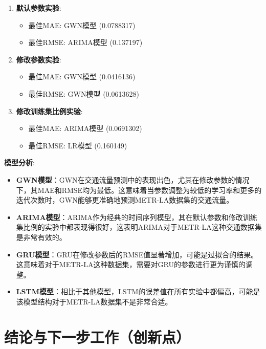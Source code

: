 \documentclass[4pt]{article}
\begin{document}
\begin{enumerate}
  \item \textbf{默认参数实验}:
    \begin{itemize}
      \item 最佳MAE: GWN模型 (0.0788317)
      \item 最佳RMSE: ARIMA模型 (0.137197)
    \end{itemize}

  \item \textbf{修改参数实验}:
    \begin{itemize}
      \item 最佳MAE: GWN模型 (0.0416136)
      \item 最佳RMSE: GWN模型 (0.0613628)
    \end{itemize}

  \item \textbf{修改训练集比例实验}:
    \begin{itemize}
      \item 最佳MAE: ARIMA模型 (0.0691302)
      \item 最佳RMSE: LR模型 (0.160149)
    \end{itemize}
\end{enumerate}

\textbf{模型分析}:
\begin{itemize}
  \item \textbf{GWN模型}：GWN在交通流量预测中的表现出色，尤其在修改参数的情况下，其MAE和RMSE均为最低。这意味着当参数调整为较低的学习率和更多的迭代次数时，GWN能够更准确地预测METR-LA数据集的交通流量。

  \item \textbf{ARIMA模型}：ARIMA作为经典的时间序列模型，其在默认参数和修改训练集比例的实验中都表现得很好，这表明ARIMA对于METR-LA这种交通数据集是非常有效的。

  \item \textbf{GRU模型}：GRU在修改参数后的RMSE值显著增加，可能是过拟合的结果。这意味着对于METR-LA这种数据集，需要对GRU的参数进行更为谨慎的调整。

  \item \textbf{LSTM模型}：相比于其他模型，LSTM的误差值在所有实验中都偏高，可能是该模型结构对于METR-LA数据集不是非常合适。

\end{itemize}

\section{结论与下一步工作（创新点）}
\end{document}
